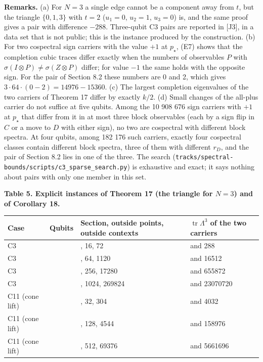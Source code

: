 \documentclass[11pt,a4paper]{article}
\begin{document}
\textbf{Remarks.} (a) For \(N=3\) a single edge cannot be a component away from \(t\), but the triangle
\(\{0,1,3\}\) with \(t=2\) (\(u_1=0\), \(u_2=1\), \(u_3=0\)) is, and the same proof gives a pair with difference
\(-288\). Three-qubit C3 pairs are reported in {[}J3{]}, in a data set that is not public; this is the instance produced by the
construction. (b) For two cospectral sign carriers with the value \(+1\) at \(p_\star\), (E7) shows that the
completion cubic traces differ exactly when the numbers of observables \(P\) with
\(\sigma(I\otimes P)\neq\sigma(Z\otimes P)\) differ; for value \(-1\) the same holds with the opposite sign. For the
pair of Section 8.2 these numbers are 0 and 2, which gives \(3\cdot64\cdot(0-2)=14976-15360\). (c) The
largest completion eigenvalues of the two carriers of Theorem 17 differ by exactly \(k/2\). (d) Small
changes of the all-plus carrier do not suffice at five qubits. Among the 10 908 676 sign carriers with
\(+1\) at \(p_\star\) that differ from it in at most three block observables (each by a sign flip in \(C\) or a
move to \(D\) with either sign), no two are cospectral with different block spectra. At four qubits,
among 182 176 such carriers, exactly four cospectral classes contain different block spectra, three of
them with different \(r_D\), and the pair of Section 8.2 lies in one of the three. The search
(\nolinkurl{tracks/spectral-bounds/scripts/c3_sparse_search.py}) is exhaustive and exact; it says nothing about pairs with only one
member in this set.

\textbf{Table 5. Explicit instances of Theorem 17 (the triangle for \(N=3\)) and of Corollary 18.}

{\def\LTcaptype{none} %
{\small
\begin{longtable}[]{@{}>{\raggedright\arraybackslash}p{}>{\raggedright\arraybackslash}p{}>{\raggedright\arraybackslash}p{}>{\raggedright\arraybackslash}p{}@{}}
\toprule\noalign{}
Case & Qubits & Section, outside points, outside contexts & \(\operatorname{tr}\Lambda^3\) of the two carriers \\
\midrule\noalign{}
\endhead
\bottomrule\noalign{}
\endlastfoot
C3 & 3 & 19, 16, 72 & 0 and 288 \\
C3 & 4 & 71, 64, 1120 & 15744 and 16512 \\
C3 & 5 & 271, 256, 17280 & 649728 and 655872 \\
C3 & 6 & 1055, 1024, 269824 & 23021568 and 23070720 \\
C11 (cone lift) & 4 & 39, 32, 304 & 1728 and 4032 \\
C11 (cone lift) & 5 & 143, 128, 4544 & 152832 and 158976 \\
C11 (cone lift) & 6 & 543, 512, 69376 & 5612544 and 5661696 \\
\end{longtable}
}
}
\end{document}

